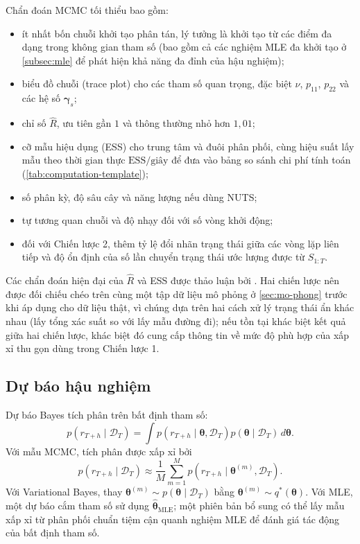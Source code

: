 \documentclass[12pt,a4paper]{article}
\numberwithin{equation}{section}
\newcommand{\bm}[1]{\symbf{#1}}
\newcommand{\Data}{\mathcal{D}}
\newcommand{\Param}{\bm{\theta}}
\begin{document}
Chẩn đoán MCMC tối thiểu bao gồm:
\begin{itemize}
  \item ít nhất bốn chuỗi khởi tạo phân tán, lý tưởng là khởi tạo từ các điểm đa dạng trong không gian tham số (bao gồm cả các nghiệm MLE đa khởi tạo ở \cref{subsec:mle} để phát hiện khả năng đa đỉnh của hậu nghiệm);
  \item biểu đồ chuỗi (trace plot) cho các tham số quan trọng, đặc biệt $\nu$, $p_{11}$, $p_{22}$ và các hệ số $\bm\gamma_s$;
  \item chỉ số $\widehat R$, ưu tiên gần $1$ và thông thường nhỏ hơn $1{,}01$;
  \item cỡ mẫu hiệu dụng (ESS) cho trung tâm và đuôi phân phối, cùng hiệu suất lấy mẫu theo thời gian thực $\mathrm{ESS}/\text{giây}$ để đưa vào bảng so sánh chi phí tính toán (\cref{tab:computation-template});
  \item số phân kỳ, độ sâu cây và năng lượng nếu dùng NUTS;
  \item tự tương quan chuỗi và độ nhạy đối với số vòng khởi động;
  \item đối với Chiến lược 2, thêm tỷ lệ đổi nhãn trạng thái giữa các vòng lặp liên tiếp và độ ổn định của số lần chuyển trạng thái ước lượng được từ $S_{1:T}$.
\end{itemize}
Các chẩn đoán hiện đại của $\widehat R$ và ESS được thảo luận bởi \cite{vehtari2021}. Hai chiến lược nên được đối chiếu chéo trên cùng một tập dữ liệu mô phỏng ở \cref{sec:mo-phong} trước khi áp dụng cho dữ liệu thật, vì chúng dựa trên hai cách xử lý trạng thái ẩn khác nhau (lấy tổng xác suất so với lấy mẫu đường đi); nếu tồn tại khác biệt kết quả giữa hai chiến lược, khác biệt đó cung cấp thông tin về mức độ phù hợp của xấp xỉ thu gọn dùng trong Chiến lược 1.

\subsection{Dự báo hậu nghiệm}\label{subsec:posterior-predictive}

Dự báo Bayes tích phân trên bất định tham số:
\begin{equation}
  p(r_{T+h}\mid\Data_T)
  =
  \int
  p(r_{T+h}\mid\Param,\Data_T)
  p(\Param\mid\Data_T)\,d\Param.
  \label{eq:posterior-predictive}
\end{equation}
Với mẫu MCMC, tích phân được xấp xỉ bởi
\begin{equation}
  p(r_{T+h}\mid\Data_T)
  \approx
  \frac{1}{M}
  \sum_{m=1}^{M}
  p(r_{T+h}\mid{\Param}^{(m)},\Data_T).
  \label{eq:mcmc-predictive}
\end{equation}
Với Variational Bayes, thay ${\Param}^{(m)}\sim p(\Param\mid\Data_T)$ bằng ${\Param}^{(m)}\sim q^*(\Param)$. Với MLE, một dự báo cắm tham số sử dụng $\widehat{\Param}_{\mathrm{MLE}}$; một phiên bản bổ sung có thể lấy mẫu xấp xỉ từ phân phối chuẩn tiệm cận quanh nghiệm MLE để đánh giá tác động của bất định tham số.
\end{document}
